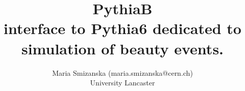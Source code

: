 
\topmargin 0cm
\topskip 0pt

\oddsidemargin  -5mm
\textheight 22cm
\textwidth 160mm
\itemsep -5mm
\newcommand{\tabulka}[3]{
  \begin{table}[h]
    \begin{center}
      #1
      \end{center}
   \caption{#2}
    \label{#3}
 \end{table}}

\newcommand{\psubt}{\mbox{$p_{T}\ $}}
\newcommand{\bquark}{\mbox{$\rm b\ $}}
\newcommand{\abquark}{\mbox{$\rm \overline{b}\ $}}
\newcommand{\bab}{\mbox{$\rm b\overline{b}\ $}}


\title{\Large{ \bf PythiaB} \\
\large{\bf interface to Pythia6 dedicated to simulation of beauty events.}}
\author{ \normalsize Maria Smizanska (maria.smizanska@cern.ch)\\
  University Lancaster}


\normalsize

\maketitle


